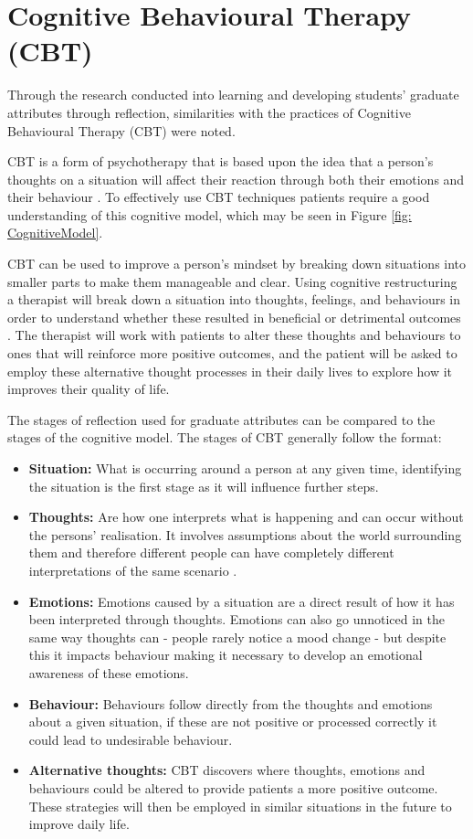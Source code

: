 \documentclass{l4proj}
\begin{document}
\section{Cognitive Behavioural Therapy (CBT)}

Through the research conducted into learning and developing students' graduate attributes through reflection, similarities with the practices of Cognitive Behavioural Therapy (CBT) were noted. 

CBT is a form of psychotherapy that is based upon the idea that a person's thoughts on a situation will affect their reaction through both their emotions and their behaviour \citep{whatisCBT_therapistAid}. To effectively use CBT techniques patients require a good understanding of this cognitive model, which may be seen in Figure \ref{fig: CognitiveModel}. 

CBT can be used to improve a person's mindset by breaking down situations into smaller parts to make them manageable and clear. Using cognitive restructuring a therapist will break down a situation into thoughts, feelings, and behaviours in order to understand whether these resulted in beneficial or detrimental outcomes \citep{nhs_cognitive_2017}. The therapist will work with patients to alter these thoughts and behaviours to ones that will reinforce more positive outcomes, and the patient will be asked to employ these alternative thought processes in their daily lives to explore how it improves their quality of life.


The stages of reflection used for graduate attributes can be compared to the stages of the cognitive model. The stages of CBT generally follow the format:
\begin{itemize}
    \item \textbf{Situation:} What is occurring around a person at any given time, identifying the situation is the first stage as it will influence further steps.
    \item \textbf{Thoughts:} Are how one interprets what is happening and can occur without the persons' realisation. It involves assumptions about the world surrounding them and therefore different people can have completely different interpretations of the same scenario \citep{therapist_aid_psychoeducation}. 
    \item \textbf{Emotions:} Emotions caused by a situation are a direct result of how it has been interpreted through thoughts. Emotions can also go unnoticed in the same way thoughts can - people rarely notice a mood change - but despite this it impacts behaviour making it necessary to develop an emotional awareness of these emotions.
    \item \textbf{Behaviour:} Behaviours follow directly from the thoughts and emotions about a given situation, if these are not positive or processed correctly it could lead to undesirable behaviour.
    \item \textbf{Alternative thoughts:} CBT discovers where thoughts, emotions and behaviours could be altered to provide patients a more positive outcome. These strategies will then be employed in similar situations in the future to improve daily life.
\end{itemize}
\end{document}
